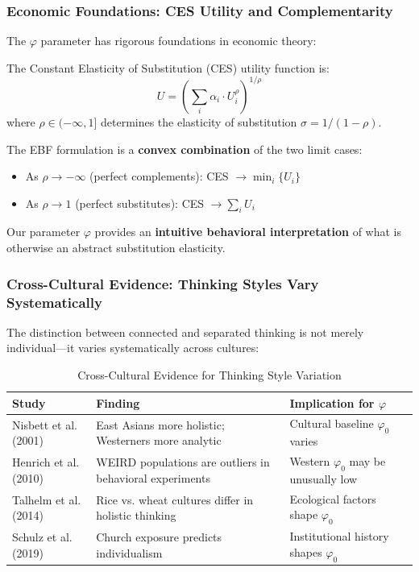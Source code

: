 \subsubsection{Economic Foundations: CES Utility and Complementarity}

The $\varphi$ parameter has rigorous foundations in economic theory:

\begin{definition}
The Constant Elasticity of Substitution (CES) utility function is:
\begin{equation}
U = \left( \sum_i \alpha_i \cdot U_i^{\rho} \right)^{1/\rho}
\end{equation}
where $\rho \in (-\infty, 1]$ determines the elasticity of substitution $\sigma = 1/(1-\rho)$.
\end{definition}

The EBF formulation is a \textbf{convex combination} of the two limit cases:
\begin{itemize}
\item As $\rho \to -\infty$ (perfect complements): CES $\to \min_i\{U_i\}$
\item As $\rho \to 1$ (perfect substitutes): CES $\to \sum_i U_i$
\end{itemize}

Our parameter $\varphi$ provides an \textbf{intuitive behavioral interpretation} of what is otherwise an abstract substitution elasticity.

\subsubsection{Cross-Cultural Evidence: Thinking Styles Vary Systematically}

The distinction between connected and separated thinking is not merely individual—it varies systematically across cultures:

\begin{table}[htbp]
\centering
\caption{Cross-Cultural Evidence for Thinking Style Variation}
\label{tab:cultural-phi}
\begin{tabular}{p{3cm}p{3cm}p{6cm}}
\toprule
\textbf{Study} & \textbf{Finding} & \textbf{Implication for $\varphi$} \\
\midrule
Nisbett et al. (2001) & East Asians more holistic; Westerners more analytic & Cultural baseline $\varphi_0$ varies \\[4pt]

Henrich et al. (2010) & WEIRD populations are outliers in behavioral experiments & Western $\varphi_0$ may be unusually low \\[4pt]

Talhelm et al. (2014) & Rice vs. wheat cultures differ in holistic thinking & Ecological factors shape $\varphi_0$ \\[4pt]

Schulz et al. (2019) & Church exposure predicts individualism & Institutional history shapes $\varphi_0$ \\
\bottomrule
\end{tabular}
\end{table}

